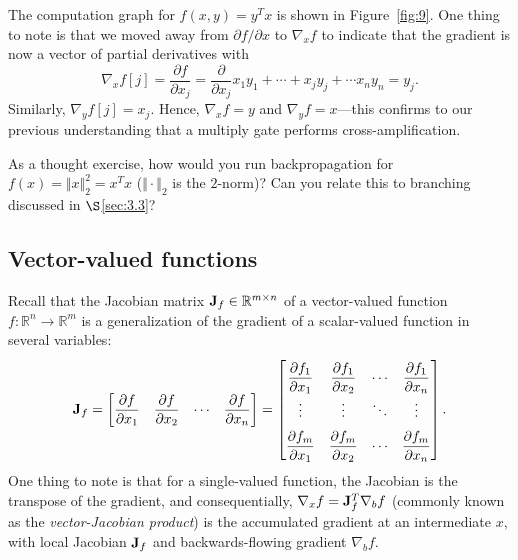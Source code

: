 The computation graph for $f(x, y) = y^T x$ is shown in Figure~\ref{fig:9}. One thing to note is that we moved away from $\partial f / \partial x$ to $\nabla_x f$ to indicate that the gradient is now a vector of partial derivatives with 
$$
\nabla_x f[j] = \frac{\partial f}{\partial x_j} = \frac{\partial}{\partial x_j} x_1 y_1 + \cdots + x_j y_j + \cdots x_n y_n = y_j.
$$
Similarly, $\nabla_y f[j] = x_j$. Hence, $\nabla_x f = y$ and $\nabla_y f = x$---this confirms to our previous understanding that a multiply gate performs cross-amplification.

As a thought exercise, how would you run backpropagation for $f(x) = \Vert x \Vert_2^2 = x^T x$ ($\Vert\cdot\Vert_2$ is the $2$-norm)? Can you relate this to branching discussed in $\S$\ref{sec:3.3}?

\subsection{Vector-valued functions}
\label{sec:4.2}

Recall that the Jacobian matrix $\mathbf{J}_f \in \mathbb{R}^{m \times n}$ of a vector-valued function $f: \mathbb{R}^n \rightarrow \mathbb{R}^m$ is a generalization of the gradient of a scalar-valued function in several variables:
$$
\J_f = \begin{bmatrix}
    \dfrac{\partial f}{\partial x_1} & 
    \dfrac{\partial f}{\partial x_2} &
    \cdots &
    \dfrac{\partial f}{\partial x_n}
\end{bmatrix} = 
\renewcommand{\arraystretch}{2}
\begin{bmatrix}
    \dfrac{\partial f_1}{\partial x_1} & \dfrac{\partial f_1}{\partial x_2} & \cdots & \dfrac{\partial f_1}{\partial x_n} \\
    \vdots & \vdots & \ddots & \vdots \\
    \dfrac{\partial f_m}{\partial x_1} & \dfrac{\partial f_m}{\partial x_2} & \cdots & \dfrac{\partial f_m}{\partial x_n}
\end{bmatrix}.
\renewcommand{\arraystretch}{1.5}
$$
One thing to note is that for a single-valued function, the Jacobian is the transpose of the gradient, and consequentially, $\nabla_x f = \mathbf{J}_f^T \nabla_b f$ (commonly known as the \textit{vector-Jacobian product}) is the accumulated gradient at an intermediate $x$, with local Jacobian $\mathbf{J}_f$ and backwards-flowing gradient $\nabla_b f$.

